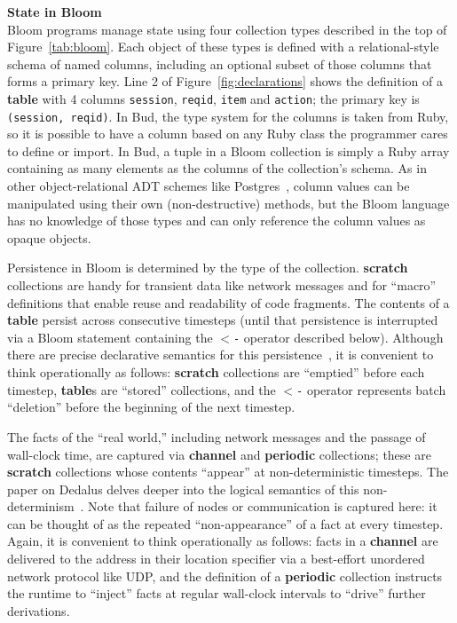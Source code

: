 \noindent\textbf{State in Bloom}\\
\noindent
Bloom programs manage state using four collection types described in the top of Figure~\ref{tab:bloom}. Each object of these types is defined with a relational-style schema of named columns, including an optional subset of those columns that forms a primary key.  Line 2 of Figure~\ref{fig:declarations} shows the definition of a \textbf{table} with 4 columns \texttt{session}, \texttt{reqid}, \texttt{item} and \texttt{action}; the primary key is \texttt{(session, reqid)}. In Bud, the type system for the columns is taken from Ruby, so it is possible to have a column based on any Ruby class the programmer cares to define or import.  In Bud, a tuple in a Bloom collection is simply a Ruby array containing as many elements as the columns of the collection's schema.  As in other object-relational ADT schemes like Postgres~\cite{postgres-adt}, column values can be manipulated using their own (non-destructive) methods, but the Bloom language has no knowledge of those types and can only reference the column values as opaque objects.  

Persistence in Bloom is determined by the type of the collection.  \textbf{scratch} collections are handy for transient data like network messages and for ``macro'' definitions that enable reuse and readability of code fragments.  The contents of a \textbf{table} persist across consecutive timesteps (until that persistence is interrupted via a Bloom statement containing the \texttt{$<$-} operator described below). Although there are precise declarative semantics for this persistence~\cite{dedalus-techr}, it is convenient to think operationally as follows: \textbf{scratch} collections are ``emptied'' before each timestep, \textbf{table}s are ``stored'' collections, and the \texttt{$<$-} operator represents batch ``deletion'' before the beginning of the next timestep.

The facts of the ``real world,'' including network messages and the passage of wall-clock time, are captured via \textbf{channel} and \textbf{periodic} collections; these are \textbf{scratch} collections whose contents ``appear'' at non-deterministic timesteps. 
The paper on Dedalus delves deeper into the logical semantics of this non-determinism~\cite{dedalus-techr}.  Note that failure of nodes or communication is captured here: it can be thought of as the repeated ``non-appearance'' of a fact at every timestep.  Again, it is convenient to think operationally as follows: facts in a \textbf{channel} are delivered to the address in their location specifier via a best-effort unordered network protocol like UDP, and the definition of a \textbf{periodic} collection instructs the runtime to ``inject'' facts at regular wall-clock intervals to ``drive'' further derivations.

